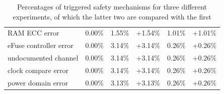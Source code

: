 \documentclass[10pt]{article}
\begin{document}
\begin{table}[H]
\begin{tabular}{lr|rr|rr}
          RAM ECC error 
          & 0.00\%
          & 1.55\% & +1.54\%
          & 1.01\% & +1.01\%
          \\
          eFuse controller error 
          & 0.00\%
          & 3.14\% & +3.14\%
          & 0.26\% & +0.26\%
          \\
          undocumented channel 
          & 0.00\%
          & 3.14\% & +3.14\%
          & 0.26\% & +0.26\%
          \\
          clock compare error 
          & 0.00\%
          & 3.14\% & +3.14\%
          & 0.26\% & +0.26\%
          \\
          power domain error 
          & 0.00\%
          & 3.13\% & +3.13\%
          & 0.26\% & +0.26\%
          \\
          \bottomrule
          \end{tabular}
        \caption{Percentages of triggered safety mechanisms for three different experiments, of which the latter two are compared with the first}
        \label{tab:tms570-fault-overview-auth-unroll}
        \end{table}
\end{document}
